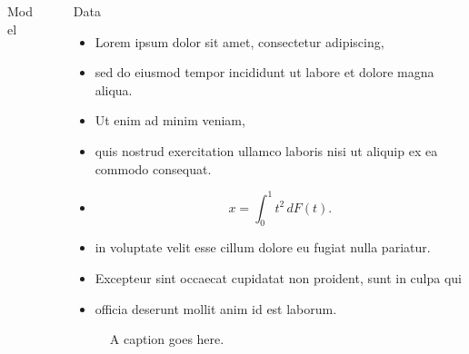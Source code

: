 \documentclass[12pt, final]{beamer}
\newlength{\sepwid}
\newlength{\onecolwid}
\newlength{\twocolwid}
\begin{document}
\begin{frame}[t]
\begin{columns}[t]
\begin{column}{\onecolwid}
\begin{block}{Model}
      \end{block}
    \end{column}
    \begin{column}{\sepwid}\end{column}
    \begin{column}{\twocolwid}
      \begin{block}{Data}
        \begin{itemize}
          \item Lorem ipsum \alert{dolor} sit amet, consectetur adipiscing,
          \item sed do eiusmod tempor incididunt ut labore et dolore magna aliqua.
          \item Ut enim ad minim veniam,
          \item quis nostrud exercitation ullamco laboris nisi ut aliquip ex ea commodo consequat.
          \item $$x = \int_0^1 t^2 \,dF(t).$$
          \item in voluptate velit \alert{esse cillum dolore} eu fugiat nulla pariatur.
          \item Excepteur sint occaecat cupidatat non proident, sunt in culpa qui
          \item officia deserunt mollit anim id est laborum.
        \end{itemize}
        \vskip1in
        \begin{figure}
          \label{fig:pic}
          \caption{A caption goes here.}
        \end{figure}
      \end{block}


\end{column}
\end{columns}
\end{frame}
\end{document}
